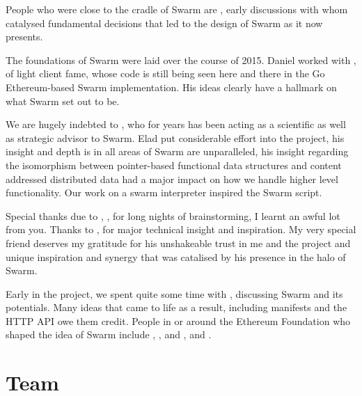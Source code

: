 People who were close to the cradle of Swarm are ,  early discussions with whom catalysed fundamental decisions that led to the design of Swarm as it now presents.

The foundations of Swarm were laid over the course of 2015.
Daniel worked with , of light client fame, whose code is still being seen here and there in the Go Ethereum-based Swarm implementation. His ideas clearly have a hallmark on what Swarm set out to be. 

We are hugely indebted to , who for years has been acting as a scientific as well as strategic advisor to Swarm. Elad put considerable effort into the project, his insight and depth is in all areas of Swarm are unparalleled, his insight regarding the isomorphism between pointer-based functional data structures and content addressed distributed data had a major impact on how we handle higher level functionality. Our work on a swarm interpreter inspired the Swarm script.

Special thanks due to , ,  for long nights of brainstorming, I learnt an awful lot from you. Thanks to ,  for major technical insight and inspiration.
My very special friend  deserves my gratitude for his unshakeable trust in me and the project and unique inspiration and synergy that was catalised by his presence in the halo of Swarm.

Early in the project, we spent quite some time with ,  discussing Swarm and its potentials. Many ideas that came to life as a result, including manifests and the HTTP API owe them credit. People in or around the Ethereum Foundation who shaped the idea of Swarm include , ,  and ,  and . 

\section*{Team}

